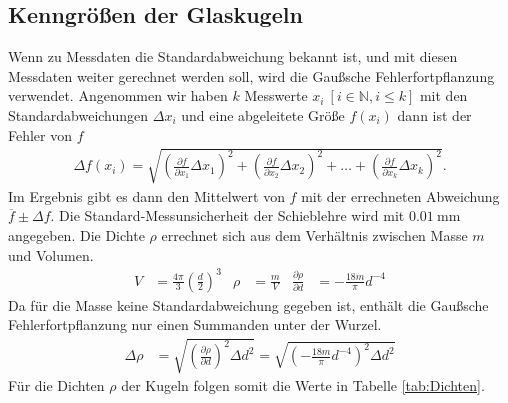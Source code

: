 \subsection{Kenngrößen der Glaskugeln}



Wenn zu Messdaten die Standardabweichung bekannt ist, und mit diesen Messdaten weiter gerechnet werden soll,
wird die Gaußsche Fehlerfortpflanzung verwendet. 
Angenommen wir haben $k$ Messwerte $x_i ~[i \in \mathbb{N}, i \leq k]$ mit den Standardabweichungen $\Delta x_i$
und eine abgeleitete Größe $f(x_i)$ dann ist der Fehler von $f$
\begin{align}
    \Delta f(x_i) = \sqrt{
    \left(\frac{\partial f}{\partial x_1} \Delta x_1\right)^2%
     + \left(\frac{\partial f}{\partial x_2} \Delta x_2\right)^2%
     + \dots%
     + \left(\frac{\partial f}{\partial x_k} \Delta x_k\right)^2%
    }.
    \label{eq:gauspflanz}
\end{align} 
Im Ergebnis gibt es dann den Mittelwert von $f$ mit der errechneten Abweichung $\overline{f} \pm \Delta f $.
Die Standard-Messunsicherheit der Schieblehre wird mit $\qty{0.01}{\mm}$ angegeben.
Die Dichte $\rho$ errechnet sich aus dem Verhältnis zwischen Masse $m$ und Volumen.
\begin{align*}
    V &= \frac{4 \pi}{3} \left(\frac{d}{2}\right)^3 & \rho &= \frac{m}{V} &
    \frac{\partial \rho}{\partial d} &= -\frac{18 m}{\pi} d^{-4} %
\end{align*}
%
Da für die Masse keine Standardabweichung gegeben ist, enthält die Gaußsche Fehlerfortpflanzung nur einen Summanden unter der Wurzel.
\begin{align*}
    \Delta \rho &= \sqrt{\left(\frac{\partial \rho}{\partial d} \right)^{2} \Delta d^{2} }%
    =\sqrt{\left(-\frac{18 m}{\pi} d^{-4} \right)^{2} \Delta d^{2} }%
\end{align*}%
Für die Dichten $\rho$ der Kugeln folgen somit die Werte in Tabelle \ref{tab:Dichten}.



